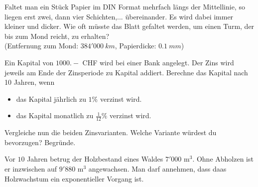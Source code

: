 \documentclass[11pt]{exam}
\begin{document}
\begin{questions}

\question[4] %
Faltet man ein Stück Papier im DIN Format mehrfach längs der Mittellinie, so liegen erst zwei, dann vier Schichten,... übereinander. Es wird dabei immer kleiner und dicker. Wie oft müsste das Blatt gefaltet werden, um einen Turm, der bis zum Mond reicht, zu erhalten?\\
(Entfernung zum Mond: $384'000\:km$, Papierdicke: $0.1\:mm$)

\question[4] %
Ein Kapital von $1000.-$ CHF wird bei einer Bank angelegt. Der Zins wird jeweils am Ende der Zinsperiode zu Kapital addiert. Berechne das Kapital nach 10 Jahren, wenn
\begin{itemize}
    \item das Kapital jährlich zu $1\%$ verzinst wird.
    \item das Kapital monatlich zu $\frac{1}{12}\%$ verzinst wird.
\end{itemize}
Vergleiche nun die beiden Zinsvarianten. Welche Variante würdest du bevorzugen? Begründe.

\question[6]
Vor $10$ Jahren betrug der Holzbestand eines Waldes $7'000$ m$^3$. Ohne Abholzen ist er inzwischen auf $9'880$ m$^3$ angewachsen. Man darf annehmen, dass daas Holzwachstum ein exponentieller Vorgang ist.
\end{questions}
\end{document}
